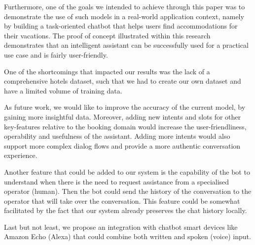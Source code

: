 \documentclass[runningheads,a4paper,11pt]{report}
\begin{document}
Furthermore, one of the goals we intended to achieve through this paper was to demonstrate the use of such models in a real-world application context, namely by building a task-oriented chatbot that helps users find accommodations for their vacations. The proof of concept illustrated within this research demonstrates that an intelligent assistant can be successfully used for a practical use case and is fairly user-friendly.

One of the shortcomings that impacted our results was the lack of a comprehensive hotels dataset, such that we had to create our own dataset and have a limited volume of training data.

As future work, we would like to improve the accuracy of the current model, by gaining more insightful data. Moreover, adding new intents and slots for other key-features relative to the booking domain would increase the user-friendliness, operability and usefulness of the assistant. Adding more intents would also support more complex dialog flows and provide a more authentic conversation experience.

Another feature that could be added to our system is the capability of the bot to understand when there is the need to request assistance from a specialised operator (human). Then the bot could send the history of the conversation to the operator that will take over the conversation. This feature could be somewhat facilitated by the fact that our system already preserves the chat history locally. 

Last but not least, we propose an integration with chatbot smart devices like Amazon Echo (Alexa) that could combine both written and spoken (voice) input.




\end{document}
